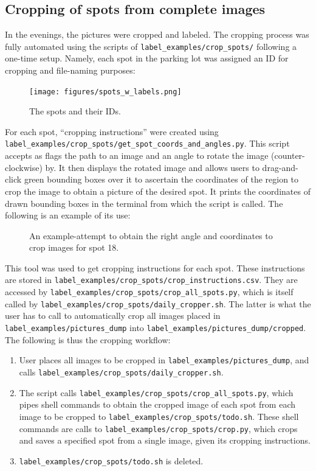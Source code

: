 \documentclass[a4paper, 11pt]{article} %
\begin{document}
	\subsection{Cropping of spots from complete images}
		In the evenings, the pictures were cropped and labeled. The cropping process was 
		fully automated	using the scripts of \texttt{label\_examples/crop\_spots/} 
		following a one-time setup. 
		Namely, each spot in the parking lot was assigned an ID for cropping and file-naming purposes:
		\begin{figure}[H]
			\centering
			\texttt{[image: figures/spots\_w\_labels.png]}
			\caption{The spots and their IDs.}
		\end{figure}
		For each spot, ``cropping instructions'' were created using\\
		\texttt{label\_examples/crop\_spots/get\_spot\_coords\_and\_angles.py}. This script accepts as flags
		the path to an image and an angle to rotate the image (counter-clockwise) by. It then displays the
		rotated image and allows users to drag-and-click green bounding boxes over it to ascertain the coordinates
		of the region to crop the image to obtain a picture of the desired spot. It prints the coordinates of drawn
		bounding boxes in the terminal from which the script is called. The following is an example of its use:
		\begin{figure}[H]
			\centering
			\caption{An example-attempt to obtain the right angle and coordinates to crop images for spot 18.}
		\end{figure}
		This tool was used to get cropping instructions for each spot. These instructions are stored in
		\texttt{label\_examples/crop\_spots/crop\_instructions.csv}. They are 
		accessed by
		\texttt{label\_examples/crop\_spots/crop\_all\_spots.py}, which is itself called by
		\texttt{label\_examples/crop\_spots/daily\_cropper.sh}. The latter is what the user has to call to automatically
		crop all images placed in \texttt{label\_examples/pictures\_dump} into \texttt{label\_examples/pictures\_dump/cropped}.
		The following is thus the cropping workflow:
		\begin{enumerate}
			\item User places all images to be cropped in \texttt{label\_examples/pictures\_dump}, and calls
			\texttt{label\_examples/crop\_spots/daily\_cropper.sh}. 
			\item The script calls \texttt{label\_examples/crop\_spots/crop\_all\_spots.py}, which pipes
			shell commands to obtain the cropped image of each spot from each image to be cropped to
			\texttt{label\_examples/crop\_spots/todo.sh}. These shell commands are calls to
			\texttt{label\_examples/crop\_spots/crop.py}, which crops and saves a specified spot from a
			single image, given its cropping instructions.
			\item \texttt{label\_examples/crop\_spots/todo.sh} is deleted.
		\end{enumerate}
\end{document}
